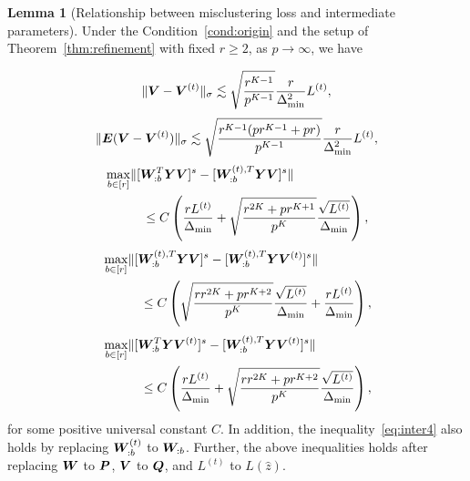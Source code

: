 \documentclass[journal]{IEEEtran}
\theoremstyle{definition}
\newtheorem{lem}{Lemma}
\theoremstyle{definition}
\newcommand{\of}[1]{\left(#1\right)}
\begin{document}
     \begin{lem}[Relationship between misclustering loss and intermediate parameters]\label{lem:intermediate} Under the Condition~\ref{cond:origin} and the setup of Theorem~\ref{thm:refinement} {with fixed $r \geq 2$, as $p \rightarrow \infty$}, we have
     
    \vspace{-0.4cm}
     \small
    \begin{equation}\label{eq:inter1}
        \onormSize{}{\mV - \mV^{(t)}}_{\sigma} \lesssim \sqrt{\frac{r^{K-1}}{p^{K-1}}}  \frac{r}{\Delta_{\min}^2} L^{(t)},
    \end{equation}
    \begin{equation}\label{eq:inter2}
        \onormSize{}{\mE (\mV - \mV^{(t)})}_{\sigma} \lesssim \sqrt{ \frac{r^{K-1}(p r^{K-1} + p r)}{p^{K-1}}} 
 \frac{r}{\Delta_{\min}^2} L^{(t)},
 \end{equation}
 \begin{align}
     &\max_{b \in [r]} \onormSize{}{ [ \mW_{:b}^T \mY \mV ]^s   -  [ \mW_{:b}^{(t), T} \mY \mV  ]^s } \\
     & \quad \quad \quad \leq C \of{\frac{r L^{(t)}}{\Delta_{\min}} + \sqrt{ \frac{r^{2K} + pr^{K+1}}{p^{K}} } \frac{\sqrt{L^{(t)}}}{\Delta_{\min}}}, \label{eq:inter3}
 \end{align}
 \begin{align}
     &\max_{b \in [r]} \onormSize{}{  [  \mW_{:b}^{(t), T}  \mY \mV]^s - [  \mW_{:b}^{(t), T}  \mY \mV^{(t)}]^s } \\
      &\quad \quad \quad  \leq C  \of{ \sqrt{ \frac{rr^{2K} + p r^{K+2}}{p^{K}}}  \frac{\sqrt{L^{(t)}}}{\Delta_{\min}} +  \frac{r L^{(t)}}{\Delta_{\min}}}, \label{eq:inter4}
 \end{align}
 \begin{align}
     & \max_{b \in [r]} \onormSize{}{ [\mW_{:b}^T \mY \mV^{(t)} ]^s   -  [ \mW_{:b}^{(t), T} \mY \mV^{(t)} ]^s }\\
     &\quad \quad \quad  \leq C \of{\frac{rL^{(t)}}{\Delta_{\min}} + \sqrt{ \frac{rr^{2K} + p r^{K+2}}{p^{K}}}  \frac{\sqrt{L^{(t)}}}{\Delta_{\min}}}, \label{eq:inter5}
 \end{align}
 \normalsize
    for some positive universal constant $C$. In addition, the inequality~\eqref{eq:inter4} also holds by replacing $\bm{W}_{:b}^{(t)}$ to $\bm{W}_{:b}$. Further, the above inequalities holds after replacing $\bm{W}$ to $\bm{P}$, $\bm{V}$ to $\bm{Q}$, and $L^{(t)}$ to $L(\hat z)$.
    \end{lem}
\end{document}
